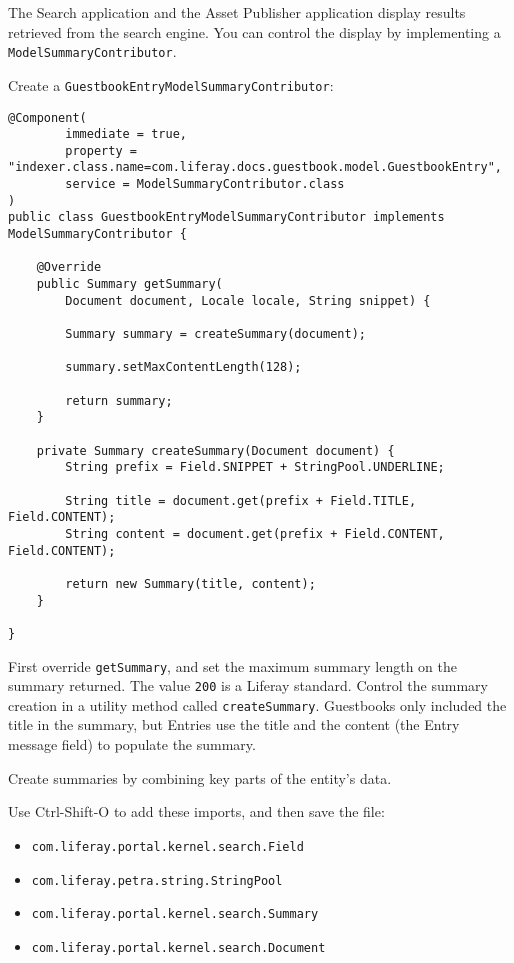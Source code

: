 The Search application and the Asset Publisher application display
results retrieved from the search engine. You can control the display by
implementing a \texttt{ModelSummaryContributor}.

Create a \texttt{GuestbookEntryModelSummaryContributor}:

\begin{verbatim}
@Component(
        immediate = true,
        property = "indexer.class.name=com.liferay.docs.guestbook.model.GuestbookEntry",
        service = ModelSummaryContributor.class
)
public class GuestbookEntryModelSummaryContributor implements ModelSummaryContributor {

    @Override
    public Summary getSummary(
        Document document, Locale locale, String snippet) {

        Summary summary = createSummary(document);

        summary.setMaxContentLength(128);

        return summary;
    }

    private Summary createSummary(Document document) {
        String prefix = Field.SNIPPET + StringPool.UNDERLINE;

        String title = document.get(prefix + Field.TITLE, Field.CONTENT);
        String content = document.get(prefix + Field.CONTENT, Field.CONTENT);

        return new Summary(title, content);
    }

}
\end{verbatim}

First override \texttt{getSummary}, and set the maximum summary length
on the summary returned. The value \texttt{200} is a Liferay standard.
Control the summary creation in a utility method called
\texttt{createSummary}. Guestbooks only included the title in the
summary, but Entries use the title and the content (the Entry message
field) to populate the summary.

Create summaries by combining key parts of the entity's data.

Use Ctrl-Shift-O to add these imports, and then save the file:

\begin{itemize}
\tightlist
\item
  \texttt{com.liferay.portal.kernel.search.Field}
\item
  \texttt{com.liferay.petra.string.StringPool}
\item
  \texttt{com.liferay.portal.kernel.search.Summary}
\item
  \texttt{com.liferay.portal.kernel.search.Document}
\end{itemize}


